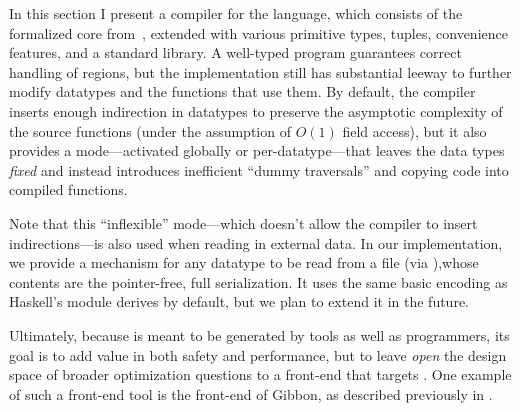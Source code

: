 In this section I present a compiler for the \ourcalc language, which consists of
the formalized core from~, extended with various primitive types, tuples,
convenience features, and a standard library.
%
A well-typed \ourcalc program guarantees correct handling of regions, but the
implementation still has substantial leeway to further modify datatypes and
the functions that use them.
%
By default, the compiler inserts enough indirection in
datatypes to preserve the asymptotic complexity of the source functions (under
the assumption of $O(1)$ field access), but it also provides a mode---activated
globally or per-datatype---that leaves the data types
\emph{fixed} and instead introduces inefficient ``dummy traversals'' and copying
code into compiled functions.
%
%

{Note that this ``inflexible'' mode---which doesn't allow the compiler to
  insert indirections---is also used when reading in external data.  In our
  \ourcalc implementation, we provide a mechanism for any datatype to be read
  from a file (via ),whose contents are the pointer-free, full
  serialization.  It uses the same basic encoding as Haskell's
   module derives by default, but we plan to extend it in the
  future.}

Ultimately, because \ourcalc is meant to be generated by tools as well as programmers,
its goal is to add value in both safety and performance, but to leave
\emph{open} the design space of broader optimization questions to a front-end that
targets \ourcalc{}. One example of such a front-end tool is the front-end of
Gibbon, as described previously in .

